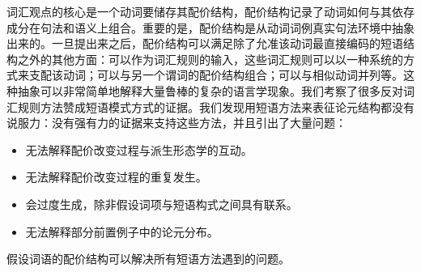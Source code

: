 \begin{exe}
\begin{xlist}[iv.]
\begin{exe}
\begin{xlist}[iv.]
词汇观点的核心是一个动词要储存其配价结构，配价结构记录了动词如何与其依存成分在句法和语义上组合。重要的是，配价结构是从动词词例真实句法环境中抽象出来的。一旦提出来之后，配价结构可以满足除了允准该动词最直接编码的短语结构之外的其他方面：可以作为词汇规则的输入，这些词汇规则可以以一种系统的方式来支配该动词；可以与另一个谓词的配价结构组合；可以与相似动词并列等。这种抽象可以非常简单地解释大量鲁棒的复杂的语言学现象。我们考察了很多反对词汇规则方法赞成短语模式方式的证据。我们发现用短语方法来表征论元结构都没有说服力：没有强有力的证据来支持这些方法，并且引出了大量问题：
\begin{itemize}
\item 无法解释配价改变过程与派生形态学的互动。
\item 无法解释配价改变过程的重复发生。
\item 会过度生成，除非假设词项与短语构式之间具有联系。
\item 无法解释部分前置例子中的论元分布。
\end{itemize}
假设词语的配价结构可以解决所有短语方法遇到的问题。


\end{xlist}
\end{exe}
\end{xlist}
\end{exe}
